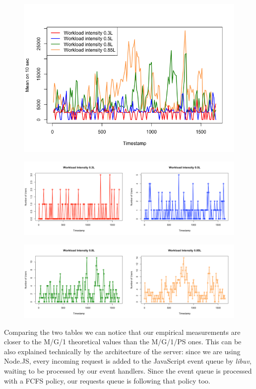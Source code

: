 \documentclass[11pt]{scrartcl} %
\begin{document}
\begin{figure}[H]
\centering
\includegraphics[width=15cm]{Images/respTimes.png}
\end{figure}

\begin{figure}[H]
\centering
\includegraphics[width=15cm]{Images/user35side.png}
\end{figure}

\begin{figure}[H]
\centering
\includegraphics[width=15cm]{Images/user858side.png}
\end{figure}


Comparing the two tables we can notice that our empirical measurements are closer to the M/G/1 theoretical values than the M/G/1/PS ones. This can be also explained technically by the architecture of the server: since we are using Node.JS, every incoming request is added to the JavaScript event queue by \textit{libuv}, waiting to be processed by our event handlers. Since the event queue is processed with a FCFS policy, our requests queue is following that policy too.
\end{document}

